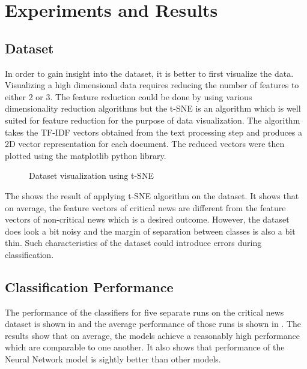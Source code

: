 \chapter{Experiments and Results} \label{result}

\section{Dataset}
In order to gain insight into the dataset, it is better to first visualize the data. Visualizing a high dimensional data requires reducing the number of features to either 2 or 3. The feature reduction could be done by using various dimensionality reduction algorithms \cite{tenenbaum2000global, roweis2000nonlinear} but the t-SNE\cite{maaten2008visualizing} is an algorithm which is well suited for feature reduction for the purpose of data visualization. The algorithm takes the TF-IDF vectors obtained from the text processing step and produces a 2D vector representation for each document. The reduced vectors were then plotted using the matplotlib\cite{hunter2007matplotlib} python library. 

\begin{figure}[h]
    \caption{Dataset visualization using t-SNE}
    \label{fig:dataset}
\end{figure}

The  shows the result of applying t-SNE algorithm on the dataset. It shows that on average, the feature vectors of critical news are different from the feature vectors of non-critical news which is a desired outcome. However, the dataset does look a bit noisy and the margin of separation between classes is also a bit thin. Such characteristics of the dataset could introduce errors during classification.

\section{Classification Performance}
The performance of the classifiers for five separate runs on the critical news dataset is shown in  and the average performance of those runs is shown in . The results show that on average, the models achieve a reasonably high performance which are comparable to one another. It also shows that performance of the Neural Network model is sightly better than other models.

